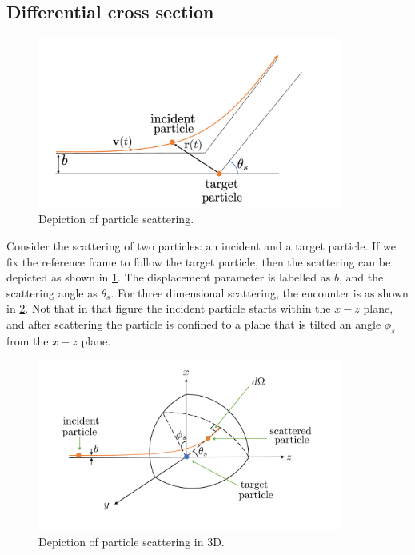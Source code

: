 \documentclass[a4paper,11pt]{report}
\begin{document}
\subsection{Differential cross section}
\begin{figure}[ht]
    \centering
    \includegraphics[width=10cm]{../../images/scattering.pdf}
    \caption{Depiction of particle scattering.}
    \label{fig:scattering}
\end{figure}

Consider the scattering of two particles: an incident and a target particle. If we fix the reference frame to follow the target particle, then the scattering can be depicted as shown in \cref{fig:scattering}. The displacement parameter is labelled as $b$, and the scattering angle as $\theta_s$. For three dimensional scattering, the encounter is as shown in \cref{fig:scattering_3d}. Not that in that figure the incident particle starts within the $x-z$ plane, and after scattering the particle is confined to a plane that is tilted an angle $\phi_s$ from the $x-z$ plane.

\begin{figure}[ht]
    \centering
    \includegraphics[width=10cm]{../../images/scattering_3d.pdf}
    \caption{Depiction of particle scattering in 3D.}
    \label{fig:scattering_3d}
\end{figure}
\end{document}
